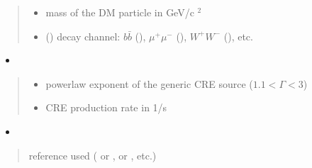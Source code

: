\documentclass[letterpaper,10pt,english]{sphinxmanual}
\begin{document}
\begin{fulllineitems}
\begin{quote}
\begin{description}
\begin{itemize}
\item {} 
\sphinxAtStartPar
{} \textendash{} mass of the DM particle in GeV/c \({}^2\)

\item {} 
\sphinxAtStartPar
{} () \textendash{} decay channel: \(b\bar b\) (), \(\mu^+ \mu^-\) (), \(W^+ W^-\) (), etc.

\end{itemize}

\end{description}\end{quote}
\begin{itemize}
\item {} 
\sphinxAtStartPar
{}

\end{itemize}
\begin{quote}\begin{description}
\begin{itemize}
\item {} 
\sphinxAtStartPar
{} \textendash{} power\sphinxhyphen{}law exponent of the generic CRE source (\(1.1 < \Gamma < 3\))

\item {} 
\sphinxAtStartPar
{} \textendash{} CRE production rate in 1/s

\end{itemize}

\end{description}\end{quote}
\begin{itemize}
\item {} 
\sphinxAtStartPar
{}

\end{itemize}
\begin{quote}\begin{description}
\sphinxAtStartPar
{} \textendash{} reference used ( or \sphinxcode{\sphinxupquote{\textquotesingle{}1309.2641\textquotesingle{}}},  or \sphinxcode{\sphinxupquote{\textquotesingle{}1408.0002\textquotesingle{}}}, etc.)


\end{description}
\end{quote}
\end{fulllineitems}
\end{document}
